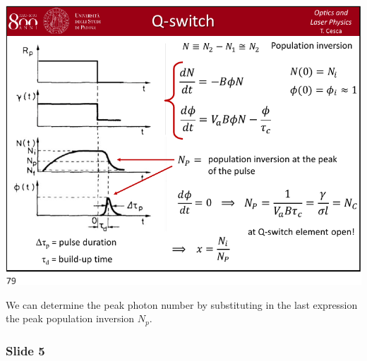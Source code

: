 \documentclass[../main/main.tex]{subfiles}
\begin{document}
\begin{minipage}[]{0.5\linewidth}
\centering
\includegraphics[page=4,width=1\textwidth]{../lessons/pdf_file/15_lecture.pdf}
\end{minipage}
\hspace{0.3cm}\vspace{0.3cm}
\begin{minipage}[c]{0.47\linewidth}

We can determine the peak photon number by substituting in the last expression the peak population inversion \( N_p \).

\end{minipage}

\subsubsection*{Slide 5}
\end{document}
